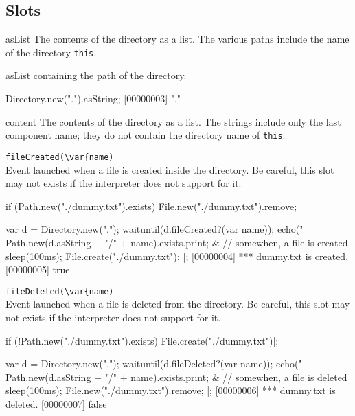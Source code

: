 \subsection{Slots}
\begin{urbiscriptapi}
\item[asList]
  The contents of the directory as a  list.  The
  various paths include the name of the directory \lstinline|this|.

\item[asList]
   containing the path of the directory.

\begin{urbiscript}
Directory.new(".").asString;
[00000003] "."
\end{urbiscript}


\item[content]
  The contents of the directory as a  list.  The
  strings include only the last component name; they do not contain
  the directory name of \lstinline|this|.

\item \lstinline|fileCreated(\var{name)|\\
  Event launched when a file is created inside the directory.  Be careful,
  this slot may not exists if the \us interpreter does not support for it.

\begin{urbiscript}[firstnumber=1]
if (Path.new("./dummy.txt").exists)
  File.new("./dummy.txt").remove;

{
  var d = Directory.new(".");
  waituntil(d.fileCreated?(var name));
  echo("%
  Path.new(d.asString + "/" + name).exists.print;
} & {
  // somewhen, a file is created
  sleep(100ms);
  File.create("./dummy.txt");
}|;
[00000004] *** dummy.txt is created.
[00000005] true
\end{urbiscript}

\item \lstinline|fileDeleted(\var{name)|\\
  Event launched when a file is deleted from the directory.  Be careful,
  this slot may not exists if the \us interpreter does not support for it.

\begin{urbiscript}
if (!Path.new("./dummy.txt").exists)
  File.create("./dummy.txt")|;

{
  var d = Directory.new(".");
  waituntil(d.fileDeleted?(var name));
  echo("%
  Path.new(d.asString + "/" + name).exists.print;
} & {
  // somewhen, a file is deleted
  sleep(100ms);
  File.new("./dummy.txt").remove;
}|;
[00000006] *** dummy.txt is deleted.
[00000007] false
\end{urbiscript}


\end{urbiscriptapi}


